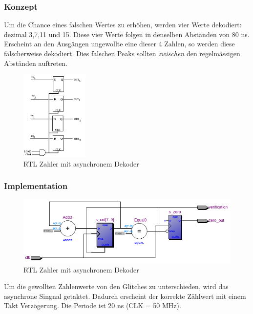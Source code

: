 \subsubsection{Konzept}
Um die Chance eines falschen Wertes zu erhöhen, werden vier Werte dekodiert: dezimal 3,7,11 und 15. Diese vier Werte folgen in denselben Abständen von 80 ns. Erscheint an den Ausgängen ungewollte eine dieser 4 Zahlen, so werden diese falscherweise dekodiert. Dies falschen Peaks sollten \textit{zwischen} den regelmässigen Abständen auftreten. 
\begin{figure}[H]
	\centering
	\includegraphics[width=0.3\textwidth]{images/4_FF.png}
	\caption{RTL Zahler mit asynchronem Dekoder}
	\label{fig.glitch.counter2}
\end{figure}


\subsubsection{Implementation}
\begin{figure}[H]
	\centering
	\includegraphics[width=\textwidth]{images/RTL_counter_2.png}
	\caption{RTL Zahler mit asynchronem Dekoder}
	\label{fig.glitch.counter2}
\end{figure}

Um die gewollten Zahlenwerte von den Glitches zu unterschieden, wird das asynchrone Singnal getaktet. Dadurch erscheint der korrekte Zählwert mit einem Takt Verzögerung. Die Periode ist 20 ns (CLK = 50 MHz).\\


